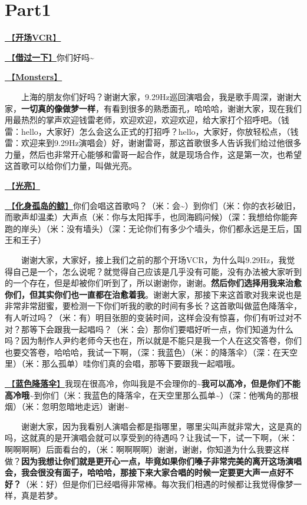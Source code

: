 \documentclass[]{ctexbook}
\begin{document}
\newpage

\section{Part1}\label{shanghai-20240518-part1}

\hyperref[opening-vcr]{🎥【\textbf{开场VCR}】}

\hyperref[I-will-go-my-way]{🎵【\textbf{借过一下}】}你们好吗\textasciitilde{}

\hyperref[Monsters]{🎵【\textbf{Monsters}】}

  上海的朋友你们好吗？谢谢大家，9.29Hz巡回演唱会，我是歌手周深，谢谢大家，\textbf{一切真的像做梦一样}，有看到很多的熟悉面孔，哈哈哈，谢谢大家，现在我们用最热烈的掌声欢迎钱雷老师，欢迎欢迎，欢迎欢迎，给大家打个招呼吧。（钱雷：hello，大家好）怎么会这么正式的打招呼？hello，大家好，你放轻松点，（钱雷：欢迎来到9.29Hz演唱会）好，谢谢雷哥，那这首歌很多人告诉我们给过他很多力量，然后也非常开心能够和雷哥一起合作，就是现场合作，这是第一次，也希望这首歌可以给你们力量，叫做光亮。

\hyperref[silver-linings]{🎵【\textbf{光亮}】}

\hyperref[hua-shen-gu-dao-de-jing]{🎵【\textbf{化身孤岛的鲸}】}你们会唱这首歌吗？（米：会\textasciitilde）到你们（米：你的衣衫破旧，而歌声却温柔）大声点（米：你与太阳挥手，也同海鸥问候）（深：我想给你能奔跑的岸头）（米：没有墙头）（深：无论你们有多少个墙头，你们都永远是王后，国王和王子）

  谢谢大家，大家好，接上我们之前的那个开场VCR，为什么叫9.29Hz，我觉得自己是一个，怎么说呢？就觉得自己应该是几乎没有可能，没有办法被大家听到的一个存在，但是却被你们听到了，所以谢谢你，谢谢。\textbf{然后你们选择用我来治愈你们，但其实你们也一直都在治愈着我}。谢谢大家，那接下来这首歌对我来说也是非常非常甜蜜，要检测一下你们听我的歌的时间有多长？这首歌叫做蓝色降落伞，有人听过吗？（米：有）明目张胆的变装时间，这样会没有惊喜，你们有听过对不对？那等下会跟我一起唱吗？（米：会）那你们要唱好听一点，你们知道为什么吗？因为制作人尹约老师今天也在，所以就是不能只是我一个人在这交答卷，你们也要交答卷，哈哈哈，我试一下啊，（深：我蓝色）（米：的降落伞）（深：在天空里）（米：那么孤单）哇你们真的会唱，那等下要跟我一起唱哦。

\hyperref[blue-parachute]{🎵【\textbf{蓝色降落伞}】}我现在很高冷，你叫我是不会理你的\textasciitilde{}\textbf{我可以高冷，但是你们不能高冷哦\textasciitilde{}}到你们（米：我蓝色的降落伞，在天空里那么孤单\textasciitilde）（深：他嘴角的那根烟）（米：忽明忽暗地走远）谢谢\textasciitilde{}

  谢谢大家，因为我看别人演唱会都是指哪里，哪里尖叫声就非常大，这是真的吗，这就真的是开演唱会就可以享受到的待遇吗？让我试一下，试一下啊，（米：啊啊啊啊）后面看台的，（米：啊啊啊啊）谢谢，谢谢，你知道为什么我要这样做？\textbf{因为我想让你们就是更开心一点，毕竟如果你们嗓子非常完美的离开这场演唱会，我会很没有面子，哈哈哈，那接下来大家合唱的时候一定要更大声一点好不好？}（米：好）但是你们已经唱得非常棒。每次我们相遇的时候都让我觉得像梦一样，真是若梦。
\end{document}
